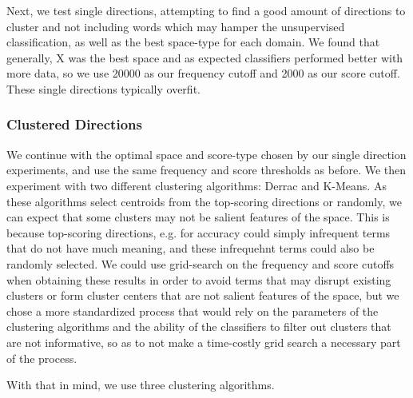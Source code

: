 Next, we test single directions, attempting to find a good amount of directions to cluster and not including words which may hamper the unsupervised classification, as well as the best space-type for each domain. We found that generally, X was the best space and as expected classifiers performed better with more data, so we use 20000 as our frequency cutoff and 2000 as our score cutoff. These single directions typically overfit.


\subsubsection{Clustered Directions}
We continue with the optimal space and score-type chosen by our single direction experiments, and use the same frequency and score thresholds as before. We then experiment with two different clustering algorithms: Derrac and K-Means. As these algorithms select centroids from the top-scoring directions or randomly, we can expect that some clusters may not be salient features of the space. This is because top-scoring directions, e.g. for accuracy could simply infrequent terms that do not have much meaning, and these infrequehnt terms could also be randomly selected. We could use grid-search on the frequency and score cutoffs when obtaining these results in order to avoid terms that may disrupt existing clusters or form cluster centers that are not salient features of the space, but we chose a more standardized process that would rely on the parameters of the clustering algorithms and the ability of the classifiers to filter out clusters that are not informative, so as to not make a time-costly grid search a necessary part of the process.

With that in mind, we use three clustering algorithms.



